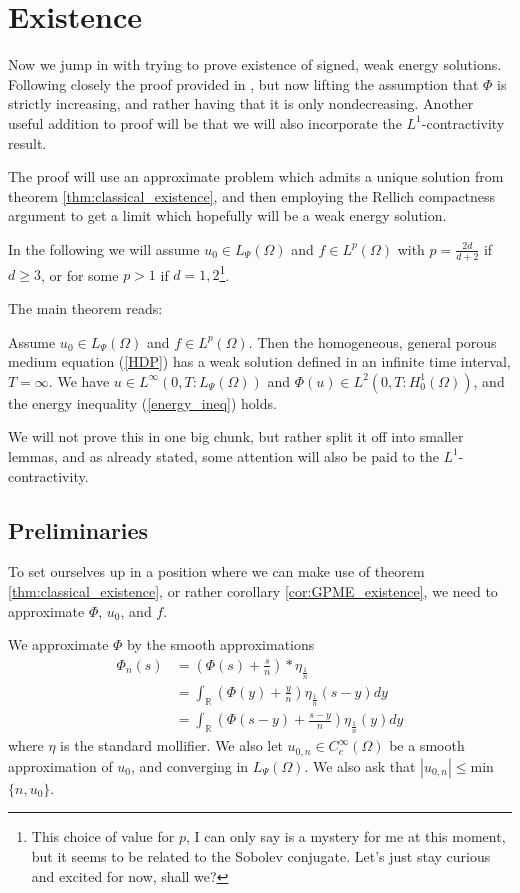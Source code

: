 \documentclass[11pt, a4paper]{article}
\begin{document}
\section{Existence}
Now we jump in with trying to prove existence of signed, weak energy solutions. Following closely the proof provided in \citep{vazquez2007porous}, but now lifting the assumption that $\Phi$ is strictly increasing, and rather having that it is only nondecreasing. Another useful addition to proof will be that we will also incorporate the $L^1$-contractivity result.

The proof will use an approximate problem which admits a unique solution from theorem \ref{thm:classical_existence}, and then employing the Rellich compactness argument to get a limit which hopefully will be a weak energy solution.

In the following we will assume $u_0 \in L_\Psi(\Omega)$ and $f\in L^p(\Omega)$ with $p = \frac{2d}{d+2}$ if $d \geq 3$, or for some $p>1$ if $d=1,2$\footnote{This choice of value for $p$, I can only say is a mystery for me at this moment, but it seems to be related to the Sobolev conjugate. Let's just stay curious and excited for now, shall we?}.

The main theorem reads:
\begin{theorem}
\label{thm:weak_existence}
Assume $u_0 \in L_\Psi(\Omega)$ and $f \in L^p (\Omega)$. Then the homogeneous, general porous medium equation (\ref{HDP}) has a weak solution defined in an infinite time interval, $T=\infty$. We have $u \in L^\infty(0,T:L_\Psi(\Omega))$ and $\Phi(u) \in L^2(0,T:H_0^1(\Omega))$, and the energy inequality (\ref{energy_ineq}) holds.
\end{theorem}

We will not prove this in one big chunk, but rather split it off into smaller lemmas, and as already stated, some attention will also be paid to the $L^1$-contractivity.
\subsection*{Preliminaries}
To set ourselves up in a position where we can make use of theorem \ref{thm:classical_existence}, or rather corollary \ref{cor:GPME_existence}, we need to approximate $\Phi$, $u_0$, and $f$.

We approximate $\Phi$ by the smooth approximations
\begin{align*}
\Phi_n(s) &= \left( \Phi(s) + \frac{s}{n} \right)*\eta_{\frac{1}{n}} \\
	&= \int_{\mathbb{R}}\left(\Phi(y) + \frac{y}{n}\right)\eta_{\frac{1}{n}}(s-y)dy \\
	&= \int_{\mathbb{R}}\left(\Phi(s-y) + \frac{s-y}{n}\right)\eta_{\frac{1}{n}}(y)dy
\end{align*}
where $\eta$ is the standard mollifier. We also let $u_{0,n}\in C^\infty_c(\Omega)$ be a smooth approximation of $u_0$, and converging in $L_\Psi(\Omega)$. We also ask that $|u_{0,n}| \leq $min$\{n,u_0\}$.
\end{document}
